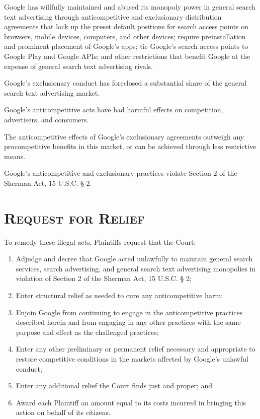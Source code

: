 \documentclass[11pt,b5paper,headings=small]{scrartcl}
\begin{document}

Google has willfully maintained and abused its monopoly power in general search
text advertising through anticompetitive and exclusionary distribution agreements that lock up
the preset default positions for search access points on browsers, mobile devices, computers, and
other devices; require preinstallation and prominent placement of Google’s apps; tie Google’s
search access points to Google Play and Google APIs; and other restrictions that benefit Google
at the expense of general search text advertising rivals.


Google’s exclusionary conduct has foreclosed a substantial share of the general
search text advertising market.


Google’s anticompetitive acts have had harmful effects on competition,
advertisers, and consumers.


The anticompetitive effects of Google’s exclusionary agreements outweigh any
procompetitive benefits in this market, or can be achieved through less restrictive means.


Google’s anticompetitive and exclusionary practices violate Section 2 of the
Sherman Act, 15 U.S.C. § 2.

\section{\textsc{Request for Relief}}


To remedy these illegal acts, Plaintiffs request that the Court:
\begin{enumerate}
\item
Adjudge and decree that Google acted unlawfully to maintain general
search services, search advertising, and general search text advertising
monopolies in violation of Section 2 of the Sherman Act, 15 U.S.C. § 2;
\item
Enter structural relief as needed to cure any anticompetitive harm;
\item
Enjoin Google from continuing to engage in the anticompetitive practices
described herein and from engaging in any other practices with the same
purpose and effect as the challenged practices;
\item
Enter any other preliminary or permanent relief necessary and appropriate
to restore competitive conditions in the markets affected by Google’s
unlawful conduct;
\item
Enter any additional relief the Court finds just and proper; and
\item
Award each Plaintiff an amount equal to its costs incurred in bringing this
action on behalf of its citizens.
\end{enumerate}
\end{document}
